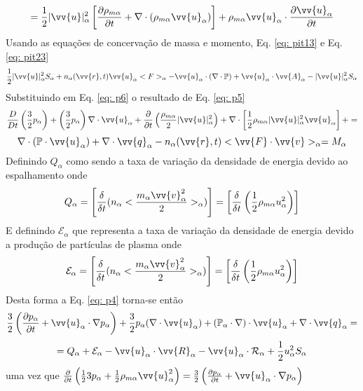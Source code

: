 \documentclass[12pt,oneside,a4paper]{abntex2}
\theoremstyle{definition}  %
\begin{document}
\begin{equation*}
= \frac{1}{2}|\vv{u}|^2_\alpha \left[  \frac{\partial \rho_{m\alpha} }{\partial t} +  \nabla \cdot (\rho_{m\alpha} \vv{u}_\alpha)   \right] + \rho_{m\alpha}  \vv{u}_\alpha \cdot \frac{\partial \vv{u}_\alpha}{\partial t}
\end{equation*}
 Usando as equações de concervação de massa e momento, Eq. \ref{eq: pit13} e Eq. \ref{eq: pit23} 
\begin{equation}
\label{eq: p6}
 \frac{1}{2}|\vv{u}|^2_\alpha S_\alpha + n_\alpha(\vv{r},t)\vv{u}_\alpha<F>_\alpha-\vv{u}_\alpha \cdot (\nabla \cdot \mathbb{P})+\vv{u}_\alpha \cdot \vv{A}_\alpha-|\vv{u}|^2_\alpha S_\alpha
 \end{equation} 
 Substituindo em Eq.  \ref{eq: p6} o resultado de Eq. \ref{eq: p5}
 \begin{equation}
\label{eq: p5}
\frac{D}{Dt} \left( \frac{3}{2}p_\alpha \right) + \left(\frac{3}{2}p_\alpha \right)  \nabla \cdot \vv{u}_\alpha +  \frac{\partial }{\partial t} \left(\frac{\rho_{m\alpha}}{2} |\vv{u}|^2_\alpha \right) +\nabla \cdot \left[ \frac{1}{2}\rho_{m\alpha}|\vv{u}|^2_\alpha \vv{u}_\alpha \right]+  = 
\end{equation}
\begin{equation*}
\nabla \cdot (\mathbb{P} \cdot \vv{u}_\alpha) + \nabla \cdot \vv{q}_\alpha-n_\alpha(\vv{r},t) <\vv{F} \cdot \vv{v}>_\alpha = M_\alpha
\end{equation*}
Definindo  $Q_\alpha$ como sendo a taxa de variação da densidade de energia devido ao espalhamento onde
\begin{equation}
Q_\alpha = \left[ \frac{\delta}{\delta t}(n_\alpha<\frac{m_\alpha \vv{v}^2_\alpha}{2}>_\alpha) \right] = \left[ \frac{\delta}{\delta t}\left( \frac{1}{2} \rho_{m\alpha} u^2_\alpha \right) \right]
\end{equation}
E definindo $\mathcal{E}_\alpha$ que representa a taxa de variação da densidade de energia devido a produção de partículas de plasma onde 
\begin{equation}
\mathcal{E}_\alpha = \left[ \frac{\delta}{\delta t}(n_\alpha<\frac{m_\alpha \vv{v}^2_\alpha}{2}>_\alpha) \right] = \left[ \frac{\delta}{\delta t}\left( \frac{1}{2} \rho_{m\alpha} u^2_\alpha \right) \right]
\end{equation}
Desta forma a Eq. \ref{eq: p4} torna-se então
\begin{equation}
\label{concenergia}
\frac{3}{2} \left( \frac{\partial p_\alpha}{\partial t} + \vv{u}_\alpha \cdot \nabla p_\alpha\right)+ \frac{3}{2} p_\alpha (\nabla \cdot \vv{u}_\alpha)+(\mathbb{P}_\alpha \cdot \nabla)\cdot \vv{u}_\alpha + \nabla \cdot \vv{q}_\alpha =  
\end{equation}
\begin{equation*}
= Q_\alpha + \mathcal{E}_\alpha-\vv{u}_\alpha \cdot \vv{R}_\alpha - \vv{u}_\alpha \cdot \mathcal{R}_\alpha+\frac{1}{2}u^2_\alpha S_\alpha
\end{equation*}
uma vez que $\frac{\partial }{\partial t}  \left( \frac{1}{2} 3p_\alpha+\frac{1}{2} \rho_{m\alpha}\vv{u}^2_\alpha \right) = \frac{3}{2} \left( \frac{\partial p_\alpha}{\partial t} + \vv{u}_\alpha \cdot \nabla p_\alpha\right)$
\end{document}
